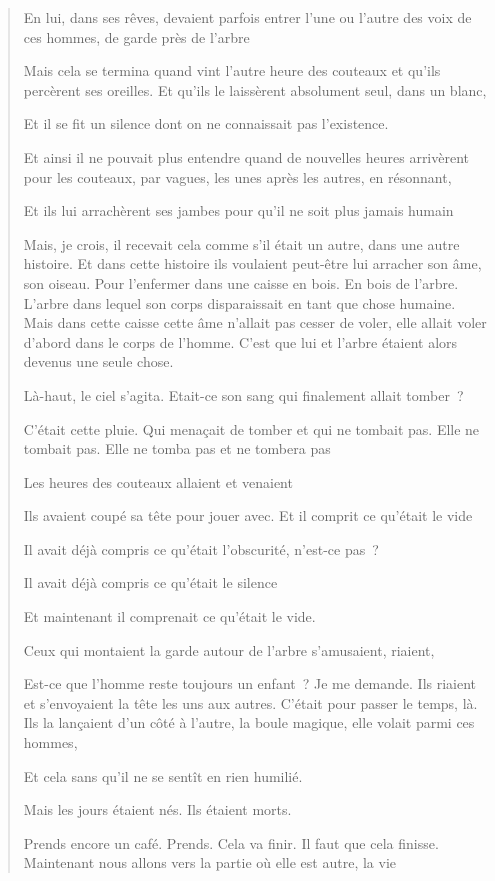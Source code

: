 \begin{quote}
En lui, dans ses rêves, devaient parfois entrer l'une ou l'autre des
voix de ces hommes, de garde près de l'arbre

Mais cela se termina quand vint l'autre heure des couteaux et qu'ils
percèrent ses oreilles. Et qu'ils le laissèrent absolument seul, dans un
blanc,

Et il se fit un silence dont on ne connaissait pas l'existence.

Et ainsi il ne pouvait plus entendre quand de nouvelles heures
arrivèrent pour les couteaux, par vagues, les unes après les autres, en
résonnant,

Et ils lui arrachèrent ses jambes pour qu'il ne soit plus jamais humain

Mais, je crois, il recevait cela comme s'il était un autre, dans une
autre histoire. Et dans cette histoire ils voulaient peut-être lui
arracher son âme, son oiseau. Pour l'enfermer dans une caisse en bois.
En bois de l'arbre. L'arbre dans lequel son corps disparaissait en tant
que chose humaine. Mais dans cette caisse cette âme n'allait pas cesser
de voler, elle allait voler d'abord dans le corps de l'homme. C'est que
lui et l'arbre étaient alors devenus une seule chose.

Là-haut, le ciel s'agita. Etait-ce son sang qui finalement allait
tomber~?

C'était cette pluie. Qui menaçait de tomber et qui ne tombait pas. Elle
ne tombait pas. Elle ne tomba pas et ne tombera pas

Les heures des couteaux allaient et venaient

Ils avaient coupé sa tête pour jouer avec. Et il comprit ce qu'était le
vide

Il avait déjà compris ce qu'était l'obscurité, n'est-ce pas~?

Il avait déjà compris ce qu'était le silence

Et maintenant il comprenait ce qu'était le vide.

Ceux qui montaient la garde autour de l'arbre s'amusaient, riaient,

Est-ce que l'homme reste toujours un enfant~? Je me demande. Ils riaient
et s'envoyaient la tête les uns aux autres. C'était pour passer le
temps, là. Ils la lançaient d'un côté à l'autre, la boule magique, elle
volait parmi ces hommes,

Et cela sans qu'il ne se sentît en rien humilié.

Mais les jours étaient nés. Ils étaient morts.

Prends encore un café. Prends. Cela va finir. Il faut que cela finisse.
Maintenant nous allons vers la partie où elle est autre, la vie


\end{quote}
